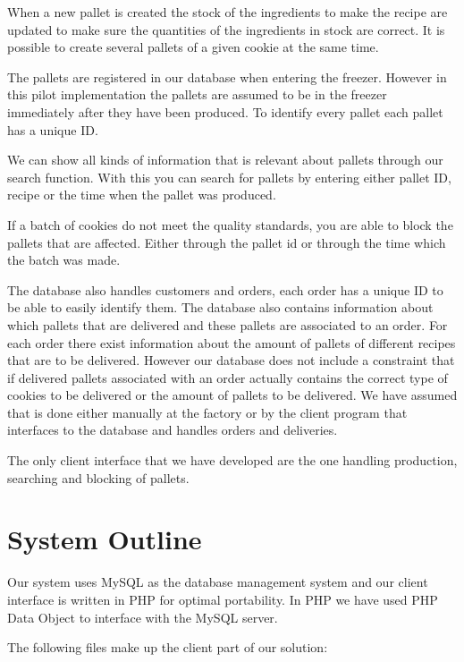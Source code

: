 \documentclass[a4paper]{article}
\begin{document}
When a new pallet is created the stock of the ingredients to make the recipe are updated to make sure the quantities of the ingredients in stock are correct. It is possible to create several pallets of a given cookie at the same time.

The pallets are registered in our database when entering the freezer. However in this pilot implementation the pallets are assumed to be in the freezer immediately after they have been produced. To identify every pallet each pallet has a unique ID.

We can show all kinds of information that is relevant about pallets through our search function. With this you can search for pallets by entering either pallet ID, recipe or the time when the pallet was produced.

If a batch of cookies do not meet the quality standards, you are able to block the pallets that are affected. Either through the pallet id or through the time which the batch was made. 

The database also handles customers and orders, each order has a unique ID to be able to easily identify them. The database also contains information about which pallets that are delivered and these pallets are associated to an order. For each order there exist information about the amount of pallets of different recipes that are to be delivered. However our database does not include a constraint that if delivered pallets associated with an order actually contains the correct type of cookies to be delivered or the amount of pallets to be delivered. We have assumed that is done either manually at the factory or by the client program that interfaces to the database and handles orders and deliveries.

The only client interface that we have developed are the one handling production, searching and blocking of pallets.




\section{System Outline}
Our system uses MySQL as the database management system and our client interface is written in PHP for optimal portability. In PHP we have used PHP Data Object to interface with the MySQL server.

The following files make up the client part of our solution:
\end{document}
